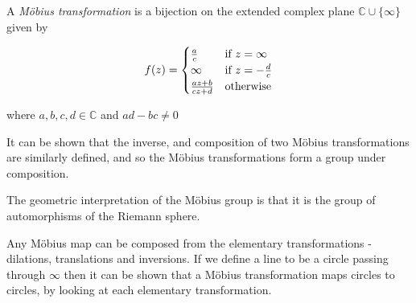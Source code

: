 \documentclass[12pt]{article}
\begin{document}
A \emph{M\"obius transformation} is a bijection on the extended complex plane $\mathbb{C} \cup \{\infty\}$ given by

$$f(z) =
\begin{cases}
\frac{a}{c} &\text{if } z = \infty \\
\infty &\text{if } z = -{d \over c}\\
\frac{az+b}{cz+d} &\text{otherwise}
\end{cases}
$$

where $a,b,c,d \in \mathbb{C}$ and $ad - bc \ne 0$

It can be shown that the inverse, and composition of two M\"obius transformations are similarly defined, and so the M\"obius transformations form a group under composition.

The geometric interpretation of the M\"obius group is that it is the group of automorphisms of the Riemann sphere.

Any M\"obius map can be composed from the elementary transformations - dilations, translations and inversions. If we define a line to be a circle passing through $\infty$ then it can be shown that a M\"obius transformation maps circles to circles, by looking at each elementary transformation.
\end{document}
